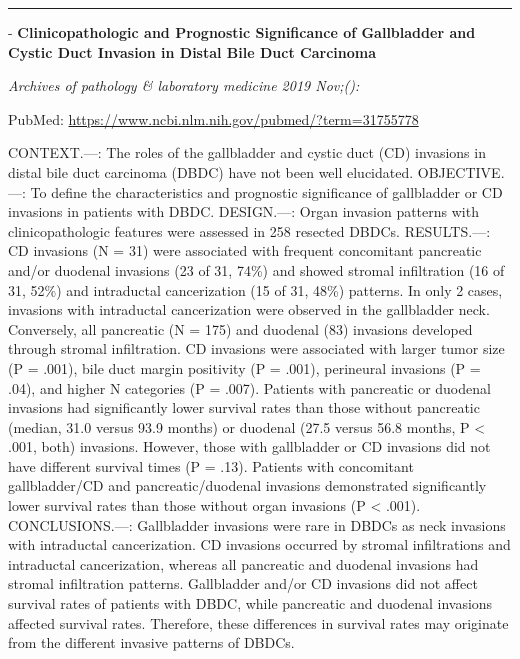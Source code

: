 \documentclass[
]{article}
\renewcommand{\linethickness}{0.05em}
\begin{document}
\begin{center}\rule{0.5\linewidth}{\linethickness}\end{center}

- \textbf{Clinicopathologic and Prognostic Significance of Gallbladder
and Cystic Duct Invasion in Distal Bile Duct Carcinoma}

\emph{Archives of pathology \& laboratory medicine 2019 Nov;():}

PubMed: \url{https://www.ncbi.nlm.nih.gov/pubmed/?term=31755778}

CONTEXT.---: The roles of the gallbladder and cystic duct (CD) invasions
in distal bile duct carcinoma (DBDC) have not been well elucidated.
OBJECTIVE.---: To define the characteristics and prognostic significance
of gallbladder or CD invasions in patients with DBDC. DESIGN.---: Organ
invasion patterns with clinicopathologic features were assessed in 258
resected DBDCs. RESULTS.---: CD invasions (N = 31) were associated with
frequent concomitant pancreatic and/or duodenal invasions (23 of 31,
74\%) and showed stromal infiltration (16 of 31, 52\%) and intraductal
cancerization (15 of 31, 48\%) patterns. In only 2 cases, invasions with
intraductal cancerization were observed in the gallbladder neck.
Conversely, all pancreatic (N = 175) and duodenal (83) invasions
developed through stromal infiltration. CD invasions were associated
with larger tumor size (P = .001), bile duct margin positivity (P =
.001), perineural invasions (P = .04), and higher N categories (P =
.007). Patients with pancreatic or duodenal invasions had significantly
lower survival rates than those without pancreatic (median, 31.0 versus
93.9 months) or duodenal (27.5 versus 56.8 months, P \textless{} .001,
both) invasions. However, those with gallbladder or CD invasions did not
have different survival times (P = .13). Patients with concomitant
gallbladder/CD and pancreatic/duodenal invasions demonstrated
significantly lower survival rates than those without organ invasions (P
\textless{} .001). CONCLUSIONS.---: Gallbladder invasions were rare in
DBDCs as neck invasions with intraductal cancerization. CD invasions
occurred by stromal infiltrations and intraductal cancerization, whereas
all pancreatic and duodenal invasions had stromal infiltration patterns.
Gallbladder and/or CD invasions did not affect survival rates of
patients with DBDC, while pancreatic and duodenal invasions affected
survival rates. Therefore, these differences in survival rates may
originate from the different invasive patterns of DBDCs.
\end{document}
